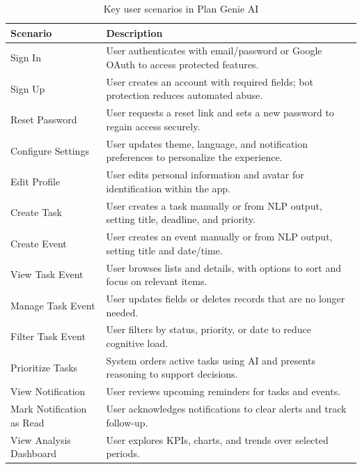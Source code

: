 \documentclass[12pt,a4paper]{article}
\begin{document}
\begin{table}[H]
  \centering
  \small
  \begin{tabular}{|l|p{}|}
    \hline
    \textbf{Scenario} & \textbf{Description} \\
    \hline
    Sign In & User authenticates with email/password or Google OAuth to access protected features. \\
    \hline
    Sign Up & User creates an account with required fields; bot protection reduces automated abuse. \\
    \hline
    Reset Password & User requests a reset link and sets a new password to regain access securely. \\
    \hline
    Configure Settings & User updates theme, language, and notification preferences to personalize the experience. \\
    \hline
    Edit Profile & User edits personal information and avatar for identification within the app. \\
    \hline
    Create Task & User creates a task manually or from NLP output, setting title, deadline, and priority. \\
    \hline
    Create Event & User creates an event manually or from NLP output, setting title and date/time. \\
    \hline
    View Task \textbar{} Event & User browses lists and details, with options to sort and focus on relevant items. \\
    \hline
    Manage Task \textbar{} Event & User updates fields or deletes records that are no longer needed. \\
    \hline
    Filter Task \textbar{} Event & User filters by status, priority, or date to reduce cognitive load. \\
    \hline
    Prioritize Tasks & System orders active tasks using AI and presents reasoning to support decisions. \\
    \hline
    View Notification & User reviews upcoming reminders for tasks and events. \\
    \hline
    Mark Notification as Read & User acknowledges notifications to clear alerts and track follow-up. \\
    \hline
    View Analysis \textbar{} Dashboard & User explores KPIs, charts, and trends over selected periods. \\
    \hline
  \end{tabular}
  \caption{Key user scenarios in Plan Genie AI}
\end{table}
\end{document}
